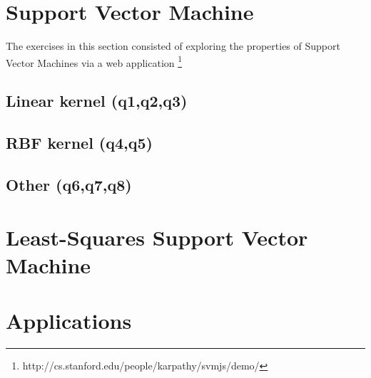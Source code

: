 \documentclass[11pt, a4paper]{article}
\begin{document}
\section{Support Vector Machine}

The exercises in this section consisted of exploring the properties of
Support Vector Machines via a web application
\footnote{http://cs.stanford.edu/people/karpathy/svmjs/demo/}

\subsection{Linear kernel (q1,q2,q3)}
\subsection{RBF kernel (q4,q5)}
\subsection{Other (q6,q7,q8)}

\section{Least-Squares Support Vector Machine}

\section{Applications} 

 
\end{document}
